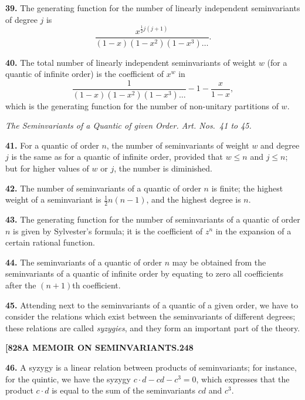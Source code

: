 \documentclass[12pt,a4paper]{article}
\theoremstyle{definition}
\begin{document}
\noindent\textbf{39.} The generating function for the number of linearly independent seminvariants of degree $j$ is
\[
\frac{x^{\frac{1}{2}j(j+1)}}{(1-x)(1-x^2)(1-x^3)\dots}.
\]

\noindent\textbf{40.} The total number of linearly independent seminvariants of weight $w$ (for a quantic of infinite order) is the coefficient of $x^w$ in
\[
\frac{1}{(1-x)(1-x^2)(1-x^3)\dots} - 1 - \frac{x}{1-x},
\]
which is the generating function for the number of non-unitary partitions of $w$.

\begin{center}
\textit{The Seminvariants of a Quantic of given Order. Art. Nos.~41 to 45.}
\end{center}

\noindent\textbf{41.} For a quantic of order $n$, the number of seminvariants of weight $w$ and degree $j$ is the same as for a quantic of infinite order, provided that $w \leq n$ and $j \leq n$; but for higher values of $w$ or $j$, the number is diminished.

\noindent\textbf{42.} The number of seminvariants of a quantic of order $n$ is finite; the highest weight of a seminvariant is $\frac{1}{2}n(n-1)$, and the highest degree is $n$.

\noindent\textbf{43.} The generating function for the number of seminvariants of a quantic of order $n$ is given by Sylvester's formula; it is the coefficient of $z^n$ in the expansion of a certain rational function.

\noindent\textbf{44.} The seminvariants of a quantic of order $n$ may be obtained from the seminvariants of a quantic of infinite order by equating to zero all coefficients after the $(n+1)$th coefficient.

\noindent\textbf{45.} Attending next to the seminvariants of a quantic of a given order, we have to consider the relations which exist between the seminvariants of different degrees; these relations are called \textit{syzygies}, and they form an important part of the theory.

\newpage
\setcounter{page}{248}

\noindent\textbf{[828}\hfill\textbf{A MEMOIR ON SEMINVARIANTS.}\hfill\textbf{248}

\bigskip

\noindent\textbf{46.} A syzygy is a linear relation between products of seminvariants; for instance, for the quintic, we have the syzygy $c \cdot d - cd - c^3 = 0$, which expresses that the product $c \cdot d$ is equal to the sum of the seminvariants $cd$ and $c^3$.
\end{document}
